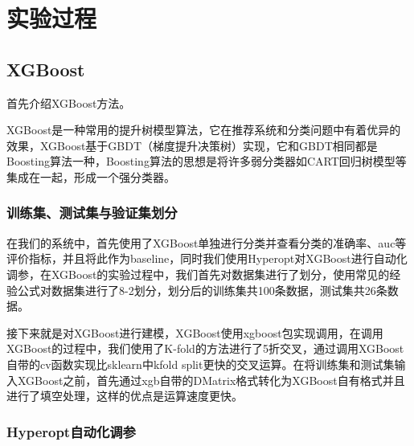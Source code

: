 %
%
%
%
%
%

\chapter{实验过程}

\section{XGBoost}

首先介绍XGBoost方法。

XGBoost是一种常用的提升树模型算法，它在推荐系统和分类问题中有着优异的效果，XGBoost基于GBDT（梯度提升决策树）实现，它和GBDT相同都是Boosting算法一种，Boosting算法的思想是将许多弱分类器如CART回归树模型等集成在一起，形成一个强分类器。

\subsection{训练集、测试集与验证集划分}

在我们的系统中，首先使用了XGBoost单独进行分类并查看分类的准确率、auc等评价指标，并且将此作为baseline，同时我们使用Hyperopt对XGBoost进行自动化调参，在XGBoost的实验过程中，我们首先对数据集进行了划分，使用常见的经验公式对数据集进行了8-2划分，划分后的训练集共100条数据，测试集共26条数据。

接下来就是对XGBoost进行建模，XGBoost使用xgboost包实现调用，在调用XGBoost的过程中，我们使用了K-fold的方法进行了5折交叉，通过调用XGBoost自带的cv函数实现比sklearn中kfold split更快的交叉运算。在将训练集和测试集输入XGBoost之前，首先通过xgb自带的DMatrix格式转化为XGBoost自有格式并且进行了填空处理，这样的优点是运算速度更快。

\subsection{Hyperopt自动化调参}

